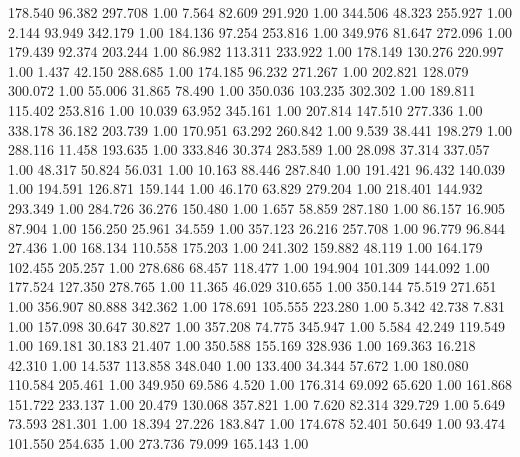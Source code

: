  178.540   96.382  297.708         1.00
   7.564   82.609  291.920         1.00
 344.506   48.323  255.927         1.00
   2.144   93.949  342.179         1.00
 184.136   97.254  253.816         1.00
 349.976   81.647  272.096         1.00
 179.439   92.374  203.244         1.00
  86.982  113.311  233.922         1.00
 178.149  130.276  220.997         1.00
   1.437   42.150  288.685         1.00
 174.185   96.232  271.267         1.00
 202.821  128.079  300.072         1.00
  55.006   31.865   78.490         1.00
 350.036  103.235  302.302         1.00
 189.811  115.402  253.816         1.00
  10.039   63.952  345.161         1.00
 207.814  147.510  277.336         1.00
 338.178   36.182  203.739         1.00
 170.951   63.292  260.842         1.00
   9.539   38.441  198.279         1.00
 288.116   11.458  193.635         1.00
 333.846   30.374  283.589         1.00
  28.098   37.314  337.057         1.00
  48.317   50.824   56.031         1.00
  10.163   88.446  287.840         1.00
 191.421   96.432  140.039         1.00
 194.591  126.871  159.144         1.00
  46.170   63.829  279.204         1.00
 218.401  144.932  293.349         1.00
 284.726   36.276  150.480         1.00
   1.657   58.859  287.180         1.00
  86.157   16.905   87.904         1.00
 156.250   25.961   34.559         1.00
 357.123   26.216  257.708         1.00
  96.779   96.844   27.436         1.00
 168.134  110.558  175.203         1.00
 241.302  159.882   48.119         1.00
 164.179  102.455  205.257         1.00
 278.686   68.457  118.477         1.00
 194.904  101.309  144.092         1.00
 177.524  127.350  278.765         1.00
  11.365   46.029  310.655         1.00
 350.144   75.519  271.651         1.00
 356.907   80.888  342.362         1.00
 178.691  105.555  223.280         1.00
   5.342   42.738    7.831         1.00
 157.098   30.647   30.827         1.00
 357.208   74.775  345.947         1.00
   5.584   42.249  119.549         1.00
 169.181   30.183   21.407         1.00
 350.588  155.169  328.936         1.00
 169.363   16.218   42.310         1.00
  14.537  113.858  348.040         1.00
 133.400   34.344   57.672         1.00
 180.080  110.584  205.461         1.00
 349.950   69.586    4.520         1.00
 176.314   69.092   65.620         1.00
 161.868  151.722  233.137         1.00
  20.479  130.068  357.821         1.00
   7.620   82.314  329.729         1.00
   5.649   73.593  281.301         1.00
  18.394   27.226  183.847         1.00
 174.678   52.401   50.649         1.00
  93.474  101.550  254.635         1.00
 273.736   79.099  165.143         1.00
